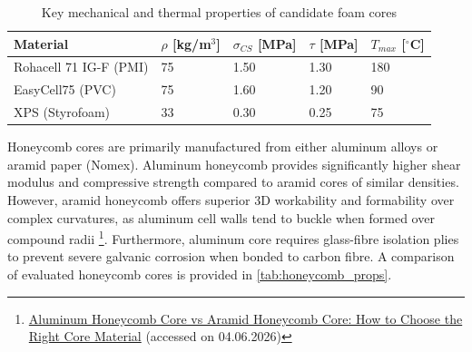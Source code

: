 \begin{table}[H]
    \centering
    \caption{Key mechanical and thermal properties of candidate foam cores
}
    \label{tab:foam_props}
    \begin{tabular}{|p{4cm}|p{1.8cm}|p{1.8cm}|p{1.5cm}|p{1.8cm}|}
        \hline
        \textbf{Material} &
        \textbf{$\rho$ [kg/m$^3$]} &
        \textbf{$\sigma_{CS}$ [MPa]} &
        \textbf{$\tau$ [MPa]} &
        \textbf{$T_{max}$ [$^\circ$C]} \\
        \hline\hline
        Rohacell 71 IG-F (PMI)
        & 75 & 1.50 & 1.30 & 180 \\
        \hline
        EasyCell75 (PVC)
        & 75 & 1.60 & 1.20 & 90 \\
        \hline
        XPS (Styrofoam)
        & 33 & 0.30 & 0.25 & 75 \\
        \hline
    \end{tabular}
\end{table}


Honeycomb cores are primarily manufactured from either aluminum alloys or aramid paper (Nomex). Aluminum honeycomb provides significantly higher shear modulus and compressive strength compared to aramid cores of similar densities. However, aramid honeycomb offers superior 3D workability and formability over complex curvatures, as aluminum cell walls tend to buckle when formed over compound radii \footnote{\href{https://www.chalcoaluminum.com/blog/aluminum-honeycomb-core-vs-aramid-honeycomb-core-2604-zmy/}{Aluminum Honeycomb Core vs Aramid Honeycomb Core: How to Choose the Right Core Material} (accessed on 04.06.2026)}. Furthermore, aluminum core requires glass-fibre isolation plies to prevent severe galvanic corrosion when bonded to carbon fibre. A comparison of evaluated honeycomb cores is provided in \autoref{tab:honeycomb_props}.

